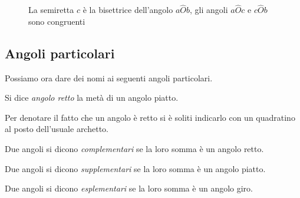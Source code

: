 \begin{figure}[htb]
\centering
\caption{La semiretta $c$ è la bisettrice dell'angolo $a\widehat{O}b$, gli angoli $a\widehat{O}c$ e $c\widehat{O}b$ sono congruenti}
\end{figure}

\subsection{Angoli particolari}

Possiamo ora dare dei nomi ai seguenti angoli particolari.

\begin{definizione}
Si dice \emph{angolo retto} la metà di un angolo piatto.
\end{definizione}

Per denotare il fatto che un angolo è retto si è soliti indicarlo con un quadratino al posto dell'usuale archetto.

\begin{figure}[htb]
\centering
\end{figure}

\begin{definizione}
Due angoli si dicono \emph{complementari} se la loro somma è un angolo retto.
\end{definizione}

\begin{figure}[htb]
\centering
\end{figure}

\begin{definizione}
Due angoli si dicono \emph{supplementari} se la loro somma è un angolo piatto.
\end{definizione}

\begin{figure}[htb]
\centering
\end{figure}

\begin{definizione}
Due angoli si dicono \emph{esplementari} se la loro somma è un angolo giro.
\end{definizione}

\begin{figure}[htb]
\centering
\end{figure}

